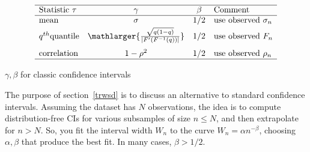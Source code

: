 \documentclass[oneside,10pt]{book}
\renewcommand{\arraystretch}{1.4} %
\begin{document}
\renewcommand{\arraystretch}{1.0} %
\renewcommand{\arraystretch}{1.2} %
\begin{table}[H]
\[
\begin{array}{lccl}
\hline
 \text{Statistic } \tau &  \gamma  & \beta & \text{Comment}   \\
\hline
\text{mean}	&	\sigma & 1/2 &  \text{use observed } \sigma_n \\[0.5ex]
q^{th} \text{quantile}	&  \mathlarger{ \frac{\sqrt{q(1-q)}}{|F' (F^{-1}(q))|}    } & 1/2 & \text{use observed $F_n$} \\[2ex]
\text{correlation} &    1-\rho^2  & 1/2 & \text{use observed } \rho_n \\
\hline
\end{array}
\]
\caption{\label{mse112dsdcx12} $\gamma,\beta$ for classic confidence intervals}
\end{table}
\renewcommand{\arraystretch}{1.0} %

The purpose of section~\ref{trwsd} is to discuss an alternative to standard confidence intervals. Assuming the dataset has
 $N$ observations, the idea is to compute distribution-free CIs for various subsamples of size $n\leq N$, and then extrapolate for
 $n > N$. So, you fit the interval width $W_n$ to the curve $W_n = \alpha n^{-\beta}$, choosing $\alpha,\beta$ that produce the best fit.
 In many cases, $\beta > 1/2$.
\end{document}
